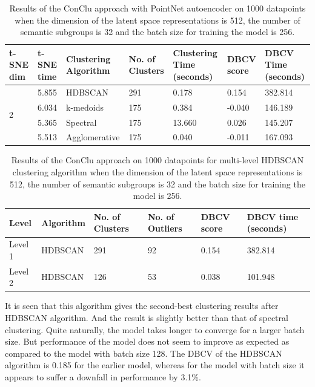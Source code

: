 \begin{table}[H]
  \setlength\extrarowheight{10pt}
  \caption{Results of the ConClu approach with PointNet autoencoder on 1000 datapoints when the dimension of the latent space representations is 512, the number of semantic subgroups is 32 and the batch size for training the model is 256. }
  \centering
  \begin{tabular}{|p{30pt}|p{50pt}|p{60pt}|p{50pt}|p{50pt}|p{50pt}|p{40pt}|}
    \toprule
    \ac{t-SNE} dim	& \ac{t-SNE} time & Clustering Algorithm & No. of Clusters & Clustering Time (seconds) & \ac{DBCV} score & \ac{DBCV} Time (seconds)\\
    \midrule
    \multirow{4}{30pt}{2}	& 5.855 & \ac{HDBSCAN}	& 291	& 0.178 & 0.154 & 382.814 \\ \cline{2-7} 
    & 6.034 & k-medoids	& 175	& 0.384 & -0.040	& 146.189 \\ \cline{2-7} 
    & 5.365 & Spectral	& 175	& 13.660 & 0.026	& 145.207 \\ \cline{2-7}
    & 5.513 & Agglomerative	& 175	& 0.040 & -0.011	& 167.093 \\ 
    \bottomrule
  \end{tabular}
  \label{tab:conclu_batch_256}
\end{table}

\begin{table}[H]
  \setlength\extrarowheight{10pt}
  \caption{Results of the ConClu approach on 1000 datapoints for multi-level \ac{HDBSCAN} clustering algorithm when the dimension of the latent space representations is 512, the number of semantic subgroups is 32 and the batch size for training the model is 256. }
  \centering
  \begin{tabular}{|l|l|l|l|l|l|}
    \toprule
    Level & Algorithm	& No. of Clusters	& No. of Outliers	& DBCV score	& \ac{DBCV} time (seconds)	\\  
    \midrule
    Level 1 & \ac{HDBSCAN} & 291	& 92	& 0.154	& 382.814 \\ \cline{1-6}
    Level 2 & \ac{HDBSCAN} & 126	& 53	& 0.038	& 101.948 \\ 
    \bottomrule
  \end{tabular}
  \label{tab:conclu_batch_256_levels}
\end{table}

It is seen that this algorithm gives the second-best clustering results after \ac{HDBSCAN} algorithm. And the result is slightly better than that of spectral clustering. Quite naturally, the model takes longer to converge for a larger batch size. But performance of the model does not seem to improve as expected as compared to the model with batch size 128. The \ac{DBCV} of the \ac{HDBSCAN} algorithm is 0.185 for the earlier model, whereas for the model with batch size it appears to suffer a downfall in performance by 3.1\%.

